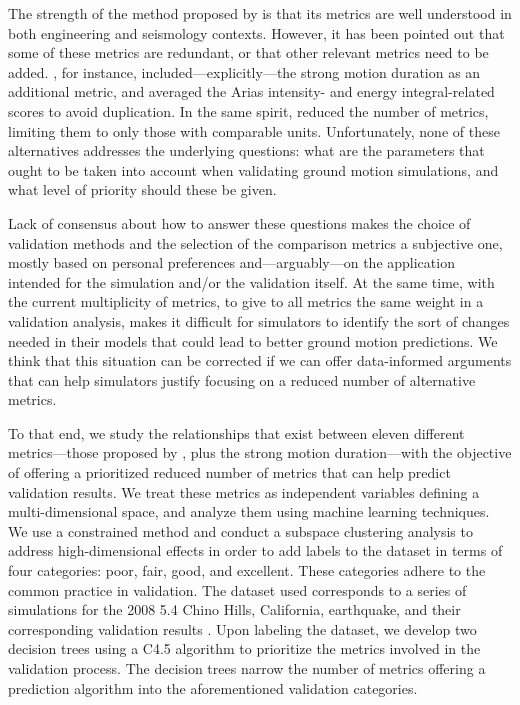 The strength of the method proposed by \citet{Anderson_2004_Proc} is that its metrics are well understood in both engineering and seismology contexts. However, it has been pointed out that some of these metrics are redundant, or that other relevant metrics need to be added. \citet{Taborda_2013_BSSA}, for instance, included---explicitly---the strong motion duration \citep{Trifunac_1975_BSSA} as an additional metric, and averaged the Arias intensity- and energy integral-related scores to avoid duplication. In the same spirit, \citet{Maufroy_2015_BSSA} reduced the number of metrics, limiting them to only those with comparable units. Unfortunately, none of these alternatives addresses the underlying questions: what are the parameters that ought to be taken into account when validating ground motion simulations, and what level of priority should these be given.

Lack of consensus about how to answer these questions makes the choice of validation methods and the selection of the comparison metrics a subjective one, mostly based on personal preferences and---arguably---on the application intended for the simulation and/or the validation itself. At the same time, with the current multiplicity of metrics, to give to all metrics the same weight in a validation analysis, makes it difficult for simulators to identify the sort of changes needed in their models that could lead to better ground motion predictions. We think that this situation can be corrected if we can offer data-informed arguments that can help simulators justify focusing on a reduced number of alternative metrics.

To that end, we study the relationships that exist between eleven different metrics---those proposed by \citet{Anderson_2004_Proc}, plus the strong motion duration---with the objective of offering a prioritized reduced number of metrics that can help predict validation results. We treat these metrics as independent variables defining a multi-dimensional space, and analyze them using machine learning techniques. We use a constrained \kmeans{} method \citep[e.g.,][]{Macqueen_1967_Proc, Wagstaff_2001_Proc} and conduct a subspace clustering analysis to address high-dimensional effects in order to add labels to the dataset in terms of four categories: poor, fair, good, and excellent. These categories adhere to the common practice in validation. The dataset used corresponds to a series of simulations for the 2008  5.4 Chino Hills, California, earthquake, and their corresponding validation results \citep{Taborda_2014_BSSA}. Upon labeling the dataset, we develop two decision trees using a C4.5 algorithm \citep[][]{Quinlan_1993_Book} to prioritize the metrics involved in the validation process. The decision trees narrow the number of metrics offering a prediction algorithm into the aforementioned validation categories.


